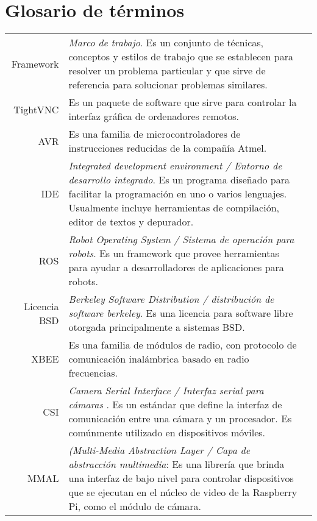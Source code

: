 \section{Glosario de t\'erminos}
\begin{tabular}{r p{13cm}l }
    Framework & \emph{Marco de trabajo}. Es un conjunto de técnicas, conceptos y estilos de trabajo que se establecen para resolver un problema particular y que sirve de referencia para solucionar problemas similares.\\

    TightVNC & Es un paquete de software que sirve para controlar la interfaz gráfica  de ordenadores remotos.\\

    AVR & Es una familia de microcontroladores de instrucciones reducidas de la compañía Atmel.\\

    IDE & \emph{Integrated development environment / Entorno de desarrollo integrado}. Es un programa diseñado para facilitar la programación en uno o varios lenguajes. Usualmente incluye herramientas de compilación, editor de textos y depurador.\\

    ROS & \emph{Robot Operating System / Sistema de operación para robots}. Es un framework que provee herramientas para ayudar a desarrolladores de aplicaciones para robots.\\

    Licencia BSD & \emph{Berkeley Software Distribution / distribución de software berkeley}. Es una licencia para software libre otorgada principalmente a sistemas BSD.\\
    
    XBEE & Es una familia de módulos de radio, con protocolo de comunicación inalámbrica basado en radio frecuencias.\\
    
    CSI & \emph{Camera Serial Interface / Interfaz serial para cámaras }. Es un estándar que define la interfaz de comunicación entre una cámara y un procesador. Es comúnmente utilizado en dispositivos móviles.\\
    
   MMAL & \emph{(Multi-Media Abstraction Layer / Capa de abstracción multimedia}: Es una librería que brinda una interfaz de bajo nivel para controlar dispositivos que se ejecutan en el núcleo de video de la Raspberry Pi, como el módulo de cámara.\\
   

\end{tabular}
